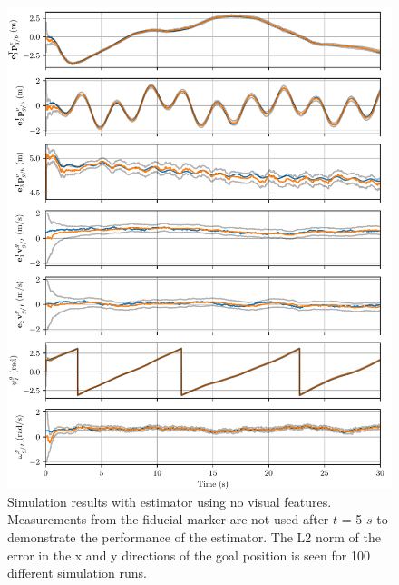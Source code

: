 \begin{figure}
  \centering
  \includegraphics[width=6.5in]{plots/single_run_with_lms}
  \caption{Simulation results with estimator using no visual
  features. Measurements from the fiducial marker are not used after $t$ = 5
$s$ to demonstrate the performance of the estimator. The L2 norm of the error in
the x and y directions of the goal position is seen for 100 different simulation
runs.}
  \label{fig:with_lms}
\end{figure}

